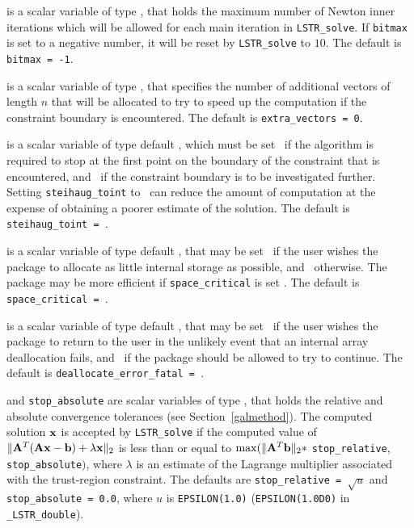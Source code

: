 \documentclass{galahad}
\newcommand{\packagename}{LS\-TR}
\newcommand{\fullpackagename}{\libraryname\_\packagename}
\begin{document}
\begin{description}
 is a scalar variable of type \integer, that holds the
maximum number of Newton inner iterations which will be allowed for each
main iteration in {\tt \packagename\_solve}.
If {\tt bitmax} is set to a negative number, it will be reset by
{\tt \packagename\_solve} to $10$.
The default is {\tt bitmax = -1}.

 is a scalar variable of type \integer,
that specifies the number of additional vectors of length $n$
that will be allocated to try to speed up the computation if the
constraint boundary  is encountered.
The default is {\tt extra\_vectors = 0}.

 is a scalar variable of type default \logical,
which must be set \true\ if the algorithm is required to stop at
the first point on the boundary of the constraint that is encountered,
and \false\  if the constraint boundary is to be investigated
further.  Setting {\tt steihaug\_toint} to \true\ can reduce the
amount of computation at the expense of obtaining a poorer estimate of
the solution.
The default is {\tt steihaug\_toint = \true}.

 is a scalar variable of type default \logical, that
may be set \true\ if the user wishes the package to allocate as little
internal storage as possible, and \false\ otherwise. The package may
be more efficient if {\tt space\_critical} is set \false.
The default is {\tt space\_critical = \false}.

 is a scalar variable of type default \logical,
that may be set \true\ if the user wishes the package to return to the user
in the unlikely event that an internal array deallocation fails,
and \false\ if the package should be allowed to try to continue.
The default is {\tt deallocate\_error\_fatal = \false}.

 and {\tt stop\_absolute} are scalar variables of type
\realdp, that holds the
relative and absolute convergence tolerances (see Section~\ref{galmethod}).
The computed solution ${\mathbf{x}}$ is accepted by {\tt \packagename\_solve}
if the computed value of
$\|{\mathbf{A}}^T ( {\mathbf{A}} {\mathbf{x}} - {\mathbf{b}} ) + \lambda {\mathbf{x}}\|_2$
is less than or equal
to $\max (\| {\mathbf{A}}^T {\mathbf{b}} \|_2 \ast$ {\tt stop\_relative},
{\tt stop\_absolute}$)$, where $\lambda$ is an estimate of the Lagrange
multiplier associated with the trust-region constraint.
The defaults are {\tt stop\_relative = $\sqrt{u}$} and
{\tt stop\_absolute = 0.0},
where $u$ is {\tt EPSILON(1.0)} ({\tt EPSILON(1.0D0)} in
{\tt \fullpackagename\_double}).


\end{description}
\end{document}
